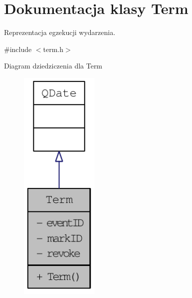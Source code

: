 \hypertarget{classTerm}{
\section{Dokumentacja klasy Term}
\label{classTerm}
}


Reprezentacja egzekucji wydarzenia.  




{\ttfamily \#include $<$term.h$>$}



Diagram dziedziczenia dla Term\nopagebreak
\begin{figure}[H]
\begin{center}
\leavevmode
\includegraphics[width=106pt]{classTerm__inherit__graph}
\end{center}
\end{figure}


